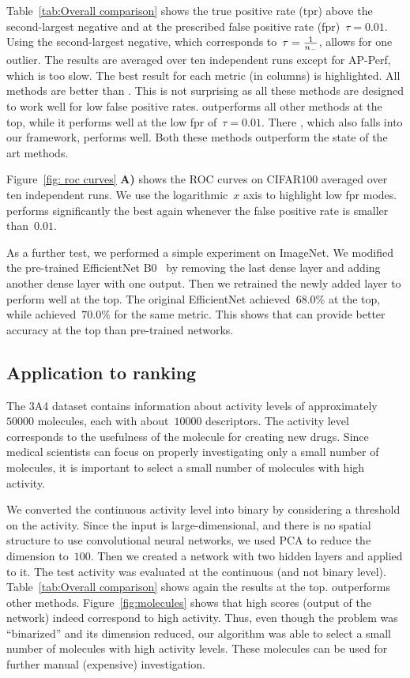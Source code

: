 Table~\ref{tab:Overall comparison} shows the true positive rate (tpr) above the second-largest negative and at the prescribed false positive rate (fpr)~$\tau=0.01$. Using the second-largest negative, which corresponds to~$\tau=\frac{1}{n_{-}}$, allows for one outlier. The results are averaged over ten independent runs except for AP-Perf, which is too slow. The best result for each metric (in columns) is highlighted. All methods are better than \BaseLine. This is not surprising as all these methods are designed to work well for low false positive rates. \DeepTopPush outperforms all other methods at the top, while it performs well at the low fpr of~$\tau=0.01$. There \PatMatNP, which also falls into our framework, performs well. Both these methods outperform the state of the art methods. 

Figure~\ref{fig: roc curves} \textbf{A)} shows the ROC curves on CIFAR100 averaged over ten independent runs. We use the logarithmic~$x$ axis to highlight low fpr modes. \DeepTopPush performs significantly the best again whenever the false positive rate is smaller than~$0.01$.

As a further test, we performed a simple experiment on ImageNet. We modified the pre-trained EfficientNet B0~\cite{tan2019efficientnet} by removing the last dense layer and adding another dense layer with one output. Then we retrained the newly added layer to perform well at the top. The original EfficientNet achieved~$68.0\%$ at the top, while \DeepTopPush achieved~$70.0\%$ for the same metric. This shows that \DeepTopPush can provide better accuracy at the top than pre-trained networks.

\subsection{Application to ranking}

The 3A4 dataset contains information about activity levels of approximately~$50000$ molecules, each with about~$10000$ descriptors. The activity level corresponds to the usefulness of the molecule for creating new drugs. Since medical scientists can focus on properly investigating only a small number of molecules, it is important to select a small number of molecules with high activity.

We converted the continuous activity level into binary by considering a threshold on the activity. Since the input is large-dimensional, and there is no spatial structure to use convolutional neural networks, we used PCA to reduce the dimension to~$100$. Then we created a network with two hidden layers and applied \DeepTopPush to it. The test activity was evaluated at the continuous (and not binary level). Table~\ref{tab:Overall comparison} shows again the results at the top. \DeepTopPush outperforms other methods. Figure~\ref{fig:molecules} shows that high scores (output of the network) indeed correspond to high activity. Thus, even though the problem was ``binarized'' and its dimension reduced, our algorithm was able to select a small number of molecules with high activity levels. These molecules can be used for further manual (expensive) investigation.

